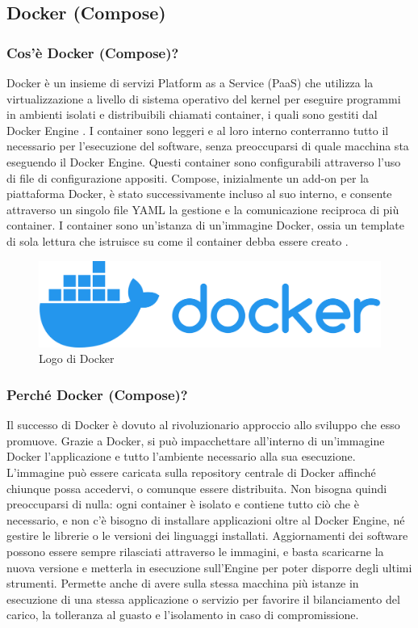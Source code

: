         \subsection{Docker (Compose)}
            \subsubsection{Cos'è Docker (Compose)?}
                Docker è un insieme di servizi Platform as a Service (PaaS) che utilizza la virtualizzazione a livello di sistema operativo del kernel per eseguire programmi in ambienti isolati e distribuibili chiamati container, i quali sono gestiti dal Docker Engine \cite{Wikipedia5}. I container sono leggeri e al loro interno conterranno tutto il necessario per l'esecuzione del software, senza preoccuparsi di quale macchina sta eseguendo il Docker Engine. Questi container sono configurabili attraverso l'uso di file di configurazione appositi. Compose, inizialmente un add-on per la piattaforma Docker, è stato successivamente incluso al suo interno, e consente attraverso un singolo file YAML la gestione e la comunicazione reciproca di più container. I container sono un'istanza di un'immagine Docker, ossia un template di sola lettura che istruisce su come il container debba essere creato \cite{Docker1}.
            \begin{figure}[htbp!]
                \centering
                \includegraphics[width=0.5\linewidth]{Immagini/System Design/Docker.png}
                \caption{Logo di Docker}
            \end{figure}
            \subsubsection{Perché Docker (Compose)?}
                Il successo di Docker è dovuto al rivoluzionario approccio allo sviluppo che esso promuove. Grazie a Docker, si può impacchettare all'interno di un'immagine Docker l'applicazione e tutto l'ambiente necessario alla sua esecuzione. L'immagine può essere caricata sulla repository centrale di Docker affinché chiunque possa accedervi, o comunque essere distribuita. Non bisogna quindi preoccuparsi di nulla: ogni container è isolato e contiene tutto ciò che è necessario, e non c'è bisogno di installare applicazioni oltre al Docker Engine, né gestire le librerie o le versioni dei linguaggi installati. Aggiornamenti dei software possono essere sempre rilasciati attraverso le immagini, e basta scaricarne la nuova versione e metterla in esecuzione sull'Engine per poter disporre degli ultimi strumenti. Permette anche di avere sulla stessa macchina più istanze in esecuzione di una stessa applicazione o servizio per favorire il bilanciamento del carico, la tolleranza al guasto e l'isolamento in caso di compromissione.

